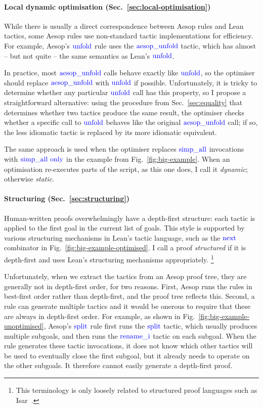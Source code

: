 \documentclass[sigplan,screen]{acmart}
\newcommand{\tac}[1]{\ensuremath{\mathrm{\mathcolor{blue}{#1}}}}
\begin{document}
\paragraph{Local dynamic optimisation (Sec.~\ref{sec:local-optimisation})}
While there is usually a direct correspondence between Aesop rules and Lean tactics, some Aesop rules use non-standard tactic implementations for efficiency.
For example, Aesop's \tac{unfold} rule uses the \tac{aesop\_unfold} tactic, which has almost -- but not quite -- the same semantics as Lean's \tac{unfold}.

In practice, most \tac{aesop\_unfold} calls behave exactly like \tac{unfold}, so the optimiser should replace \tac{aesop\_unfold} with \tac{unfold} if possible.
Unfortunately, it is tricky to determine whether any particular \tac{unfold} call has this property, so I propose a straightforward alternative:
using the procedure from Sec.~\ref{sec:equality} that determines whether two tactics produce the same result, the optimiser checks whether a specific call to \tac{unfold} behaves like the original \tac{aesop\_unfold} call; if so, the less idiomatic tactic is replaced by its more idiomatic equivalent.

The same approach is used when the optimiser replaces \tac{simp\_all} invocations with \tac{simp\_all~only} in the example from Fig.~\ref{fig:big-example}.
When an optimisation re-executes parts of the script, as this one does, I call it \emph{dynamic}; otherwise \emph{static}.

\paragraph{Structuring (Sec.~\ref{sec:structuring})}
Human-written proofs overwhelmingly have a depth-first structure: each tactic is applied to the first goal in the current list of goals.
This style is supported by various structuring mechanisms in Lean's tactic language, such as the \tac{next} combinator in Fig.~\ref{fig:big-example-optimised}.
I call a proof \emph{structured} if it is depth-first and uses Lean's structuring mechanisms appropriately.%
\footnote{This terminology is only loosely related to structured proof languages such as Isar~\cite{Isar}.}

Unfortunately, when we extract the tactics from an Aesop proof tree, they are generally not in depth-first order, for two reasons.
First, Aesop runs the rules in best-first order rather than depth-first, and the proof tree reflects this.
Second, a rule can generate multiple tactics and it would be onerous to require that these are always in depth-first order.
For example, as shown in Fig.~\ref{fig:big-example-unoptimised}, Aesop's \tac{split} rule first runs the \tac{split} tactic, which usually produces multiple subgoals, and then runs the \tac{rename\_i} tactic on each subgoal.
When the rule generates these tactic invocations, it does not know which other tactics will be used to eventually close the first subgoal, but it already needs to operate on the other subgoals.
It therefore cannot easily generate a depth-first proof.
\end{document}
